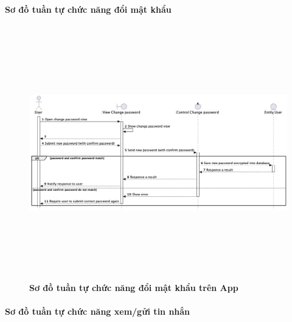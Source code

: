   \paragraph{Sơ đồ tuần tự chức năng đổi mật khẩu}
\mbox{}

  \begin{figure}[H]
        \centering
        \includegraphics[width=16cm,height=11cm]{Images/mobile_app/change_password.png}
        \caption[Sơ đồ tuần tự chức năng đổi mật khẩu trên App]{\bfseries \fontsize{12pt}{0pt}
        \selectfont Sơ đồ tuần tự chức năng đổi mật khẩu trên App}
        \label{hinh21} %
  \end{figure}


\paragraph{Sơ đồ tuần tự chức năng xem/gửi tin nhắn}
\mbox{}


